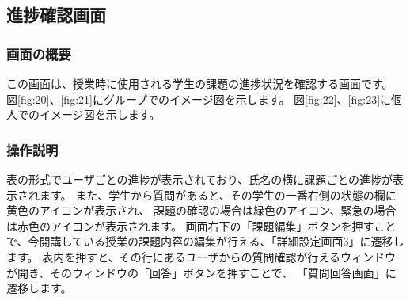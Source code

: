 
\newpage

\subsection{進捗確認画面}
\subsubsection{画面の概要}
この画面は、授業時に使用される学生の課題の進捗状況を確認する画面です。
図\ref{fig:20}、\ref{fig:21}にグループでのイメージ図を示します。
図\ref{fig:22}、\ref{fig:23}に個人でのイメージ図を示します。

\subsubsection{操作説明}
表の形式でユーザごとの進捗が表示されており、氏名の横に課題ごとの進捗が表示されます。%
また、学生から質問があると、その学生の一番右側の状態の欄に黄色のアイコンが表示され、
課題の確認の場合は緑色のアイコン、緊急の場合は赤色のアイコンが表示されます。
画面右下の「課題編集」ボタンを押すことで、今開講している授業の課題内容の編集が行える、「詳細設定画面3」に遷移します。
表内を押すと、その行にあるユーザからの質問確認が行えるウィンドウが開き、そのウィンドウの「回答」ボタンを押すことで、%
「質問回答画面」に遷移します。

